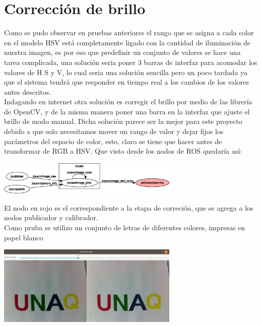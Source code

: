 \section{Corrección de brillo}
Como se pudo observar en pruebas anteriores el rango que se asigna a cada color en el modelo HSV está
completamente ligado con la cantidad de iluminación de nuestra imagen, es por eso que predefinir
un conjunto de valores se hace una tarea complicada, una solución seria poner 3 barras de interfaz
para acomodar los valores de H S y V, lo cual seria una solución sencilla pero un poco tardada ya que
el sistema tendrá que responder en tiempo real a los cambios de los valores antes descritos.\\
Indagando en internet otra solución es corregir el brillo por medio de las librería de OpenCV,
y de la misma manera poner una barra en la interfaz que ajuste el brillo de modo manual. Dicha solución
parece ser la mejor para este proyecto debido a que solo necesitamos mover un rango de valor y dejar
fijos los parámetros del espacio de color, esto, claro se tiene que hacer antes de transformar de RGB
a HSV. Que visto desde los nodos de ROS quedaría así:
\begin{center}
	\includegraphics[width=0.65\textwidth]{Contenido/Cuerpo/Capitulo4/Fig14.eps}
	\label{Fig9}
\end{center}
El nodo en rojo es el correspondiente a la etapa de correción, que se agrega a los nodos
publicador y calibrador.\\
Como pruba se utilizo un conjunto de letras de diferentes colores, impresas en papel blanco
\begin{center}
	\includegraphics[width=0.65\textwidth]{Contenido/Cuerpo/Capitulo4/Fig13.eps}
	\label{Fig9}
\end{center}
